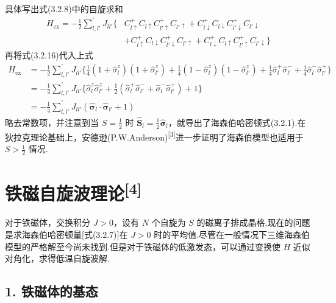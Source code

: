 具体写出式(3.2.8)中的自旋求和
\begin{equation}
\begin{aligned}
  H_{\mathrm{ex}}=-\frac{1}{2}\sum_{l,l'}^{\prime}J_{ll'}\bigl\{&C_{l\uparrow}^{+}C_{l\uparrow}C_{l'\uparrow}^{+}C_{l'\uparrow}
  +C_{l\downarrow}^{+}C_{l\downarrow}C_{l'\downarrow}^{+}C_{l'\downarrow}\\
  &+C_{l\uparrow}^{+}C_{l\downarrow}C_{l'\downarrow}^{+}C_{l'\uparrow}
  +C_{l\downarrow}^{+}C_{l\uparrow}C_{l'\uparrow}^{+}C_{l'\downarrow}\bigr\}
\end{aligned}
\end{equation}
再将式(3.2.16)代入上式
\begin{equation}
\begin{aligned}
  H_{\mathrm{ex}}&=-\frac{1}{2}\sum_{l,l'}^{\prime}J_{ll'}\biggl\{\frac{1}{4}\left(1+\hat{\sigma}_l^{z}\right)\left(1+\hat{\sigma}_{l'}^{z}\right)
  +\frac{1}{4}\left(1-\hat{\sigma}_l^{z}\right)\left(1-\hat{\sigma}_{l'}^{z}\right)
  +\frac{1}{4}\hat{\sigma}_l^{+}\hat{\sigma}_{l'}^{-}+\frac{1}{4}\hat{\sigma}_l^{-}\hat{\sigma}_{l'}^{+}\biggr\}\\
  &=-\frac{1}{4}\sum_{l,l'}^{\prime}J_{ll'}\biggl\{\hat{\sigma}_l^{z}\hat{\sigma}_{l'}^{z}
  +\frac{1}{2}\left(\hat{\sigma}_l^{+}\hat{\sigma}_{l'}^{-}+\hat{\sigma}_l^{-}\hat{\sigma}_{l'}^{+}\right)+1\biggr\}\\
  &=-\frac{1}{4}\sum_{l,l'}^{\prime}J_{ll'}\left(\hat{\boldsymbol{\sigma}}_l\cdot\hat{\boldsymbol{\sigma}}_{l'}+1\right)
\end{aligned}
\end{equation}
略去常数项，并注意到当 $S=\frac{1}{2}$ 时 $\hat{\boldsymbol{S}}_l=\frac{1}{2}\hat{\boldsymbol{\sigma}}_l$，就导出了海森伯哈密顿式(3.2.1).在狄拉克理论基础上，安德逊(P.W.Anderson)\textsuperscript{[3]}进一步证明了海森伯模型也适用于 $S>\frac{1}{2}$ 情况.

\section{铁磁自旋波理论\textsuperscript{[4]}}

对于铁磁体，交换积分 $J>0$，设有 $N$ 个自旋为 $S$ 的磁离子排成晶格.现在的问题是求海森伯哈密顿量[式(3.2.7)]在 $J>0$ 时的平均值.尽管在一般情况下三维海森伯模型的严格解至今尚未找到.但是对于铁磁体的低激发态，可以通过变换使 $H$ 近似对角化，求得低温自旋波解.

\subsection*{1. 铁磁体的基态}

